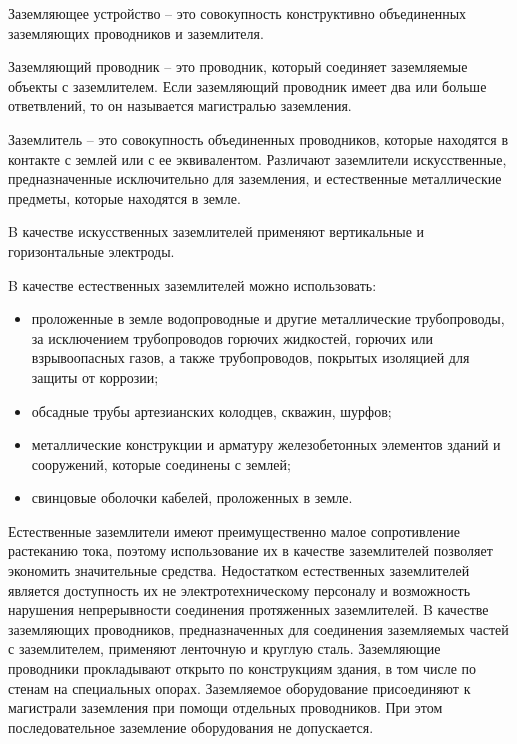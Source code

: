         Заземляющее устройство – это совокупность конструктивно объединенных
        заземляющих проводников и заземлителя.

        Заземляющий проводник – это проводник, который соединяет заземляемые
        объекты с заземлителем.  Если заземляющий проводник имеет два или
        больше ответвлений, то он называется магистралью заземления.

        Заземлитель – это совокупность объединенных проводников, которые
        находятся в контакте с землей или с ее эквивалентом. Различают
        заземлители искусственные, предназначенные исключительно для
        заземления, и естественные металлические предметы, которые находятся в
        земле.

        B качестве искусственных заземлителей применяют вертикальные и
        горизонтальные электроды.

        B качестве естественных заземлителей можно использовать:
        \begin{itemize}
            \item проложенные в земле водопроводные и другие металлические
                трубопроводы, за исключением трубопроводов горючих жидкостей,
                горючих или взрывоопасных газов, а также трубопроводов,
                покрытых изоляцией для защиты от коррозии;
            \item обсадные трубы артезианских колодцев, скважин, шурфов;
            \item металлические конструкции  и арматуру железобетонных
                элементов зданий и сооружений, которые соединены с землей;
            \item свинцовые оболочки кабелей, проложенных в земле.
        \end{itemize}

        Естественные заземлители имеют преимущественно малое сопротивление
        растеканию тока, поэтому использование их в качестве заземлителей
        позволяет экономить значительные средства. Недостатком естественных
        заземлителей является доступность их не электротехническому персоналу и
        возможность нарушения непрерывности соединения протяженных
        заземлителей. B качестве заземляющих проводников, предназначенных для
        соединения заземляемых частей с заземлителем, применяют ленточную и
        круглую сталь. Заземляющие проводники прокладывают открыто по
        конструкциям здания, в том числе по стенам на специальных опорах.
        Заземляемое оборудование присоединяют к магистрали заземления при
        помощи отдельных проводников. При этом последовательное заземление
        оборудования не допускается.


